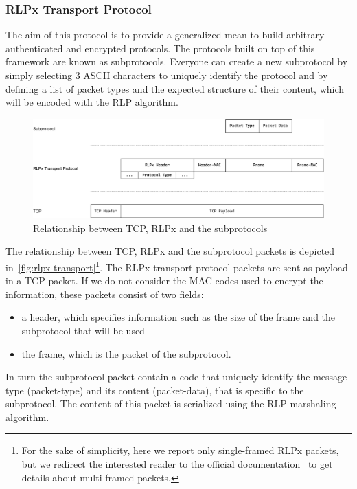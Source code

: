 \subsubsection{RLPx Transport Protocol}
\label{sec:rlpx-transport-protocol}

The aim of this protocol is to provide a generalized mean to build arbitrary
authenticated and encrypted protocols. The protocols built on top of this
framework are known as subprotocols. Everyone can create a new subprotocol by
simply selecting $3$ ASCII characters to uniquely identify the protocol and by
defining a list of packet types and the expected structure of their content,
which will be encoded with the RLP algorithm.

\begin{figure}
  \begin{center}
    \includegraphics[width=\textwidth]{./res/img/rlpx-transport}
    \caption{Relationship between TCP, RLPx and the subprotocols}
    \label{fig:rlpx-transport}
  \end{center}
\end{figure}

The relationship between TCP, RLPx and the subprotocol packets is depicted
in~\autoref{fig:rlpx-transport}\footnote{For the sake of simplicity, here we
report only single-framed RLPx packets, but we redirect the interested reader to
the official documentation~\cite{rlpx} to get details about multi-framed
packets.}. The RLPx transport protocol packets are sent as payload in a TCP
packet. If we do not consider the MAC codes used to encrypt the information,
these packets consist of two fields:
\begin{itemize}
  \item a header, which specifies information such as the size of the frame and
  the subprotocol that will be used
  \item the frame, which is the packet of the subprotocol.
\end{itemize}

In turn the subprotocol packet contain a code that uniquely identify the message
type (packet-type) and its content (packet-data), that is specific to the
subprotocol. The content of this packet is serialized using the RLP marshaling
algorithm.

